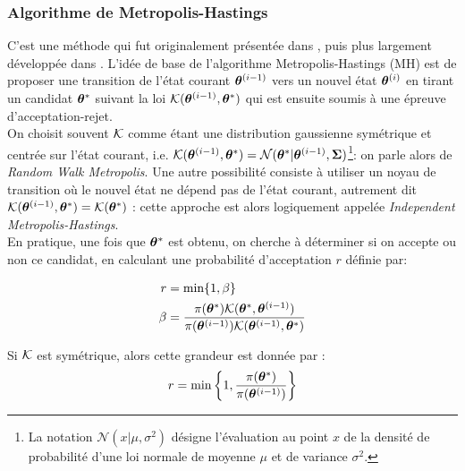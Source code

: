 \subsubsection{Algorithme de Metropolis-Hastings}

C'est une méthode qui {fut} originalement présentée dans \cite{Metropolis1953}, puis plus largement développée dans \cite{Hastings1970}. L'idée de base de l'algorithme Metropolis-Hastings (MH) est de proposer une transition de l'état courant ${{\bm{\theta}}^{(i-1)}}$ vers un nouvel état ${\bm{\theta}}^{(i)}$ en tirant un candidat ${{\bm{\theta}}^*}$ suivant la loi ${\mathcal{K}}({{\bm{\theta}}^{(i-1)}}, {{\bm{\theta}}^*})$ qui est ensuite soumis à une épreuve d'acceptation-rejet. \\

On choisit souvent ${\mathcal{K}}$ comme étant une distribution gaussienne symétrique et centrée sur l'état courant, i.e. ${\mathcal{K}}({{\bm{\theta}}^{(i-1)}}, {{\bm{\theta}}^*}) = \mathcal{N}({{\bm{\theta}}^*} | {{\bm{\theta}}^{(i-1)}}, {\bm{\Sigma}})$\footnote{La notation $\mathcal{N}(x|\mu,\sigma^2)$ désigne l'évaluation au point $x$ de la densité de probabilité d'une loi normale de moyenne $\mu$ et de variance $\sigma^2$.}: on parle alors de \textit{Random Walk Metropolis}. Une autre possibilité consiste à utiliser un noyau de transition où le nouvel état ne dépend pas de l'état courant, autrement dit ${\mathcal{K}}({{\bm{\theta}}^{(i-1)}}, {{\bm{\theta}}^*}) = {\mathcal{K}}({{\bm{\theta}}^*})$ : cette approche est alors logiquement appelée \textit{Independent Metropolis-Hastings}. \\

En pratique, une fois que ${{\bm{\theta}}^*}$ est obtenu, on cherche à déterminer si on accepte ou non ce candidat, en calculant une probabilité d'acceptation $r$ définie par:

\begin{equation}
	\label{eq_acceptation_MH}
	\begin{split}
	r & =\min\{1,\beta\} \\
	\beta & =\dfrac{\pi({{\bm{\theta}}^*}){\mathcal{K}}({{\bm{\theta}}^*}, {{\bm{\theta}}^{(i-1)}})}{\pi({{\bm{\theta}}^{(i-1)}}){\mathcal{K}}({{\bm{\theta}}^{(i-1)}}, {{\bm{\theta}}^*})}
	\end{split}
\end{equation}

{
Si ${\mathcal{K}}$ est symétrique, alors cette grandeur est donnée par : 
}
\begin{equation}
{
	r = \min\left\{1,\dfrac{\pi({{\bm{\theta}}^*})}{\pi({{\bm{\theta}}^{(i-1)}})}\right\}
	\label{eq_acceptation_metropolis}
}
\end{equation}

